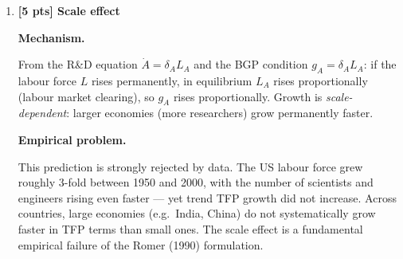 \documentclass[a4paper,11pt]{article}
\begin{document}
\begin{enumerate}[label=\textbf{(\arabic*)},leftmargin=*]
\begin{answerbox}
On the BGP, $\pi_t$ is constant and $\dot{V}/V = g_A$ (blueprint value grows at the innovation rate). Rearranging:
\[
  r V = \pi + g_A V \quad \Longrightarrow \quad \boxed{V = \frac{\pi}{r - g_A}}
\]
(requires $r > g_A$ for convergence, analogous to the Gordon growth model).

\textbf{Free-entry condition.}

Labour is the only input to R\&D. If $\delta_A$ blueprints can be produced per unit of research labour, the value of the labour time equals the value of the patent:
\[
  \delta_A V = w \tag{free entry}
\]
If $\delta_A V > w$, researchers could earn more in R\&D and would switch; equilibrium requires equality.

\textbf{BGP growth rate.}

Innovation occurs at rate $g_A = \dot{A}/A = \delta_A L_A$ (from the R\&D equation $\dot{A} = \delta_A L_A$). So:
\[
  g_A^* = \delta_A L_A^* = \delta_A(L - L_Y^*)
\]
$L_Y^*$ is determined by the goods-market equilibrium: given $r$, $x^*$ pinned down by monopoly pricing, total capital demand $A x^*$ pins down $K$, and the household Euler equation determines $r$ on the BGP. Simultaneously, the free-entry condition ties the wage to $\delta_A V = \delta_A \pi/(r - g_A)$, and the labour market clears at $L_A^* = g_A^*/\delta_A$.
\end{answerbox}

\bigskip

\item \textbf{[5 pts] Scale effect}

\begin{answerbox}
\textbf{Mechanism.}

From the R\&D equation $\dot{A} = \delta_A L_A$ and the BGP condition $g_A = \delta_A L_A$: if the labour force $L$ rises permanently, in equilibrium $L_A$ rises proportionally (labour market clearing), so $g_A$ rises proportionally. Growth is \emph{scale-dependent}: larger economies (more researchers) grow permanently faster.

\textbf{Empirical problem.}

This prediction is strongly rejected by data. The US labour force grew roughly 3-fold between 1950 and 2000, with the number of scientists and engineers rising even faster --- yet trend TFP growth did not increase. Across countries, large economies (e.g.\ India, China) do not systematically grow faster in TFP terms than small ones. The scale effect is a fundamental empirical failure of the Romer (1990) formulation.


\end{answerbox}
\end{enumerate}
\end{document}
